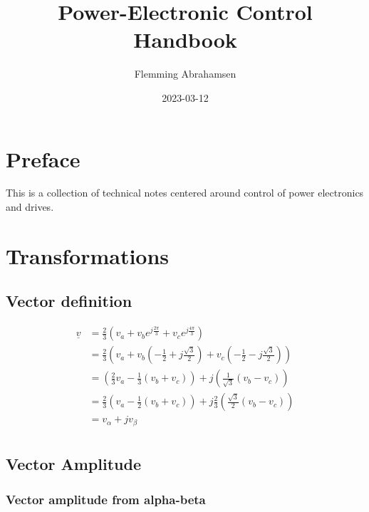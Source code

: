 \documentclass[]{book}
\title{Power-Electronic Control Handbook}
\author{Flemming Abrahamsen}
\date{2023-03-12}
\begin{document}
\maketitle

{
\setcounter{tocdepth}{1}
\tableofcontents
}
\hypertarget{preface}{%
\chapter{Preface}\label{preface}}

This is a collection of technical notes centered around control of power electronics and drives.

\hypertarget{transformations}{%
\chapter{Transformations}\label{transformations}}

\hypertarget{vector-definition}{%
\section{Vector definition}\label{vector-definition}}

\[
\begin{aligned}
\underline{v} 
& = \frac{2}{3} \left( v_a + v_b e^{j \frac{2 \pi}{3}}+ v_c e^{j \frac{4 \pi}{3}} \right)\\
& = \frac{2}{3} \left( v_a + v_b (- \frac{1}{2}+j\frac{\sqrt{3}}{2}) + v_c (- \frac{1}{2}-j\frac{\sqrt{3}}{2}) \right)\\
& = \left(\frac{2}{3} v_a - \frac{1}{3}  (v_b+v_c) \right) + j \left( \frac{1}{\sqrt{3}} (v_b-v_c) \right)   \\
& = \frac{2}{3} \left( v_a - \frac{1}{2}  (v_b+v_c) \right) + j \frac{2}{3} \left( \frac{\sqrt{3}}{2} (v_b-v_c) \right)   \\
& = v_\alpha + j v_\beta   \\
\end{aligned}
\label{eq:trans1}
\]

\hypertarget{vector-amplitude}{%
\section{Vector Amplitude}\label{vector-amplitude}}

\hypertarget{vector-amplitude-from-alpha-beta}{%
\subsection{Vector amplitude from alpha-beta}\label{vector-amplitude-from-alpha-beta}}
\end{document}

